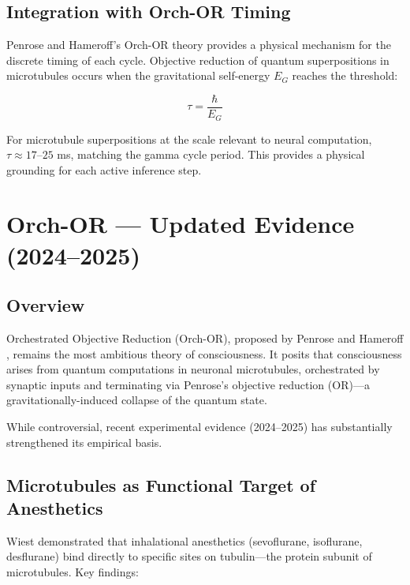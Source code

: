 \documentclass[12pt,a4paper]{article}
\begin{document}
\subsection{Integration with Orch-OR Timing}

Penrose and Hameroff's Orch-OR theory \cite{Penrose2014} provides a physical
mechanism for the discrete timing of each cycle. Objective reduction of
quantum superpositions in microtubules occurs when the gravitational
self-energy $E_G$ reaches the threshold:

\begin{equation}
\tau = \frac{\hbar}{E_G}
\end{equation}

\noindent
For microtubule superpositions at the scale relevant to neural computation,
$\tau \approx 17$--$25$ ms, matching the gamma cycle period. This provides
a physical grounding for each active inference step.

\section{Orch-OR --- Updated Evidence (2024--2025)}
\label{sec:orch_or}

\subsection{Overview}

Orchestrated Objective Reduction (Orch-OR), proposed by Penrose and Hameroff
\cite{Penrose2014}, remains the most ambitious theory of consciousness. It
posits that consciousness arises from quantum computations in neuronal
microtubules, orchestrated by synaptic inputs and terminating via Penrose's
objective reduction (OR)---a gravitationally-induced collapse of the quantum
state.

While controversial, recent experimental evidence (2024--2025) has
substantially strengthened its empirical basis.

\subsection{Microtubules as Functional Target of Anesthetics}

Wiest \cite{Wiest2025} demonstrated that inhalational anesthetics
(sevoflurane, isoflurane, desflurane) bind directly to specific sites on
tubulin---the protein subunit of microtubules. Key findings:
\end{document}
